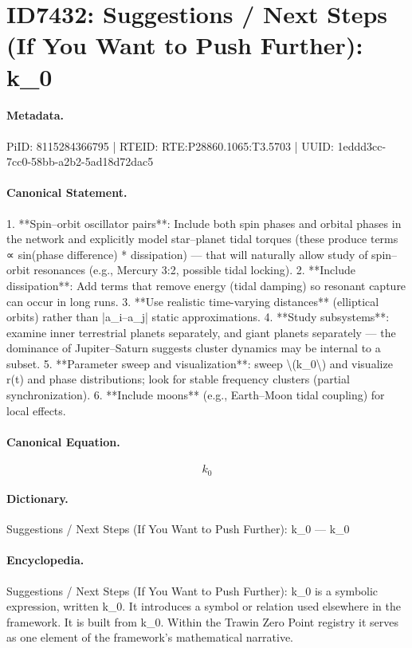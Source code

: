 \section*{ID7432: Suggestions / Next Steps (If You Want to Push Further): k\_0}
\paragraph{Metadata.}
PiID: 8115284366795 | RTEID: RTE:P28860.1065:T3.5703 | UUID: 1eddd3cc-7cc0-58bb-a2b2-5ad18d72dac5

\paragraph{Canonical Statement.}
1. **Spin–orbit oscillator pairs**: Include both spin phases and orbital phases in the network and explicitly model star–planet tidal torques (these produce terms ∝ sin(phase difference) * dissipation) — that will naturally allow study of spin–orbit resonances (e.g., Mercury 3:2, possible tidal locking). 2. **Include dissipation**: Add terms that remove energy (tidal damping) so resonant capture can occur in long runs. 3. **Use realistic time-varying distances** (elliptical orbits) rather than |a\_i–a\_j| static approximations. 4. **Study subsystems**: examine inner terrestrial planets separately, and giant planets separately — the dominance of Jupiter–Saturn suggests cluster dynamics may be internal to a subset. 5. **Parameter sweep and visualization**: sweep \textbackslash{}(k\_0\textbackslash{}) and visualize r(t) and phase distributions; look for stable frequency clusters (partial synchronization). 6. **Include moons** (e.g., Earth–Moon tidal coupling) for local effects.

\paragraph{Canonical Equation.}
\[
k_0
\]

\paragraph{Dictionary.}
Suggestions / Next Steps (If You Want to Push Further): k\_0 — k\_0

\paragraph{Encyclopedia.}
Suggestions / Next Steps (If You Want to Push Further): k\_0 is a symbolic expression, written k\_0. It introduces a symbol or relation used elsewhere in the framework. It is built from k\_0. Within the Trawin Zero Point registry it serves as one element of the framework's mathematical narrative.
